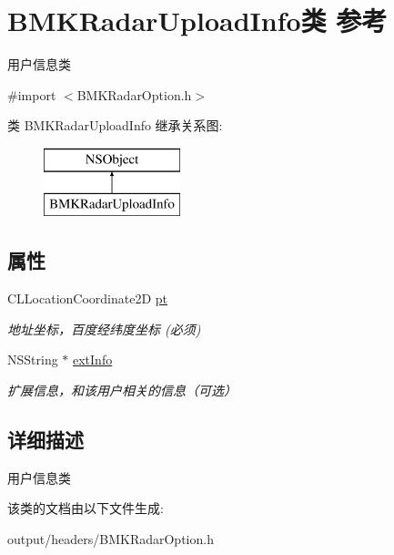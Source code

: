 \hypertarget{interface_b_m_k_radar_upload_info}{}\section{B\+M\+K\+Radar\+Upload\+Info类 参考}
\label{interface_b_m_k_radar_upload_info}


用户信息类  




{\ttfamily \#import $<$B\+M\+K\+Radar\+Option.\+h$>$}

类 B\+M\+K\+Radar\+Upload\+Info 继承关系图\+:\begin{figure}[H]
\begin{center}
\leavevmode
\includegraphics[height=2.000000cm]{interface_b_m_k_radar_upload_info}
\end{center}
\end{figure}
\subsection*{属性}
\begin{DoxyCompactItemize}
\item 
\hypertarget{interface_b_m_k_radar_upload_info_ae452bebc54865898bf805c190720ddb4}{}C\+L\+Location\+Coordinate2\+D \hyperlink{interface_b_m_k_radar_upload_info_ae452bebc54865898bf805c190720ddb4}{pt}\label{interface_b_m_k_radar_upload_info_ae452bebc54865898bf805c190720ddb4}

\begin{DoxyCompactList}\small\item\em 地址坐标，百度经纬度坐标 (必须) \end{DoxyCompactList}\item 
\hypertarget{interface_b_m_k_radar_upload_info_a7d6f1fc7b28ddad73ce09b76e9f66cd1}{}N\+S\+String $\ast$ \hyperlink{interface_b_m_k_radar_upload_info_a7d6f1fc7b28ddad73ce09b76e9f66cd1}{ext\+Info}\label{interface_b_m_k_radar_upload_info_a7d6f1fc7b28ddad73ce09b76e9f66cd1}

\begin{DoxyCompactList}\small\item\em 扩展信息，和该用户相关的信息（可选） \end{DoxyCompactList}\end{DoxyCompactItemize}


\subsection{详细描述}
用户信息类 

该类的文档由以下文件生成\+:\begin{DoxyCompactItemize}
\item 
output/headers/B\+M\+K\+Radar\+Option.\+h\end{DoxyCompactItemize}
